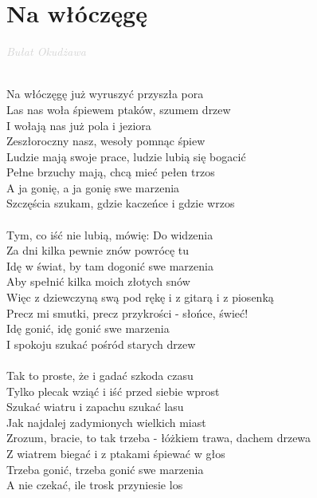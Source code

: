 \documentclass[a5paper, 10pt]{book}
\begin{document}
\newpage
\section{Na włóczęgę}\textcolor{lightgray}{\textit{Bułat Okudżawa}}\\~\\
\begin{minipage}[t]{0.82\textwidth}
Na włóczęgę już wyruszyć przyszła pora\\
Las nas woła śpiewem ptaków, szumem drzew\\
I wołają nas już pola i jeziora\\
Zeszłoroczny nasz, wesoły pomnąc śpiew\\
\hspace*{5mm}Ludzie mają swoje prace, ludzie lubią się bogacić\\
\hspace*{5mm}Pełne brzuchy mają, chcą mieć pełen trzos\\
A ja gonię, a ja gonię swe marzenia\\
Szczęścia szukam, gdzie kaczeńce i gdzie wrzos\\
\\
Tym, co iść nie lubią, mówię: Do widzenia\\
Za dni kilka pewnie znów powrócę tu\\
Idę w świat, by tam dogonić swe marzenia\\
Aby spełnić kilka moich złotych snów\\
\hspace*{5mm}Więc z dziewczyną swą pod rękę i z gitarą i z piosenką\\
\hspace*{5mm}Precz mi smutki, precz przykrości - słońce, świeć!\\
Idę gonić, idę gonić swe marzenia\\
I spokoju szukać pośród starych drzew\\
\\
Tak to proste, że i gadać szkoda czasu\\
Tylko plecak wziąć i iść przed siebie wprost\\
Szukać wiatru i zapachu szukać lasu\\
Jak najdalej zadymionych wielkich miast\\
\hspace*{5mm}Zrozum, bracie, to tak trzeba - łóżkiem trawa, dachem drzewa\\
\hspace*{5mm}Z wiatrem biegać i z ptakami śpiewać w głos\\
Trzeba gonić, trzeba gonić swe marzenia\\
A nie czekać, ile trosk przyniesie los\\
\\

\end{minipage}
\end{document}

